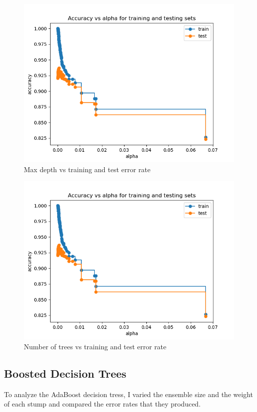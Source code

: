 \documentclass[12pt]{article}
\begin{document}
\begin{figure}[h!]
    \centering
    \includegraphics[width=0.8\linewidth]{figures/CCP/Accuracy vs alpha for train and test sets.png}
    \caption{Max depth vs training and test error rate}
    \label{fig:mcc}
\end{figure}

\begin{figure}[h!]
    \centering
    \includegraphics[width=0.8\linewidth]{figures/CCP/Accuracy vs alpha for train and test sets.png}
    \caption{Number of trees vs training and test error rate}
    \label{fig:mcc}
\end{figure}

\subsection{Boosted Decision Trees}
To analyze the AdaBoost decision tress, I varied the ensemble size and the weight of each stump and compared the error rates that they produced.
\end{document}
